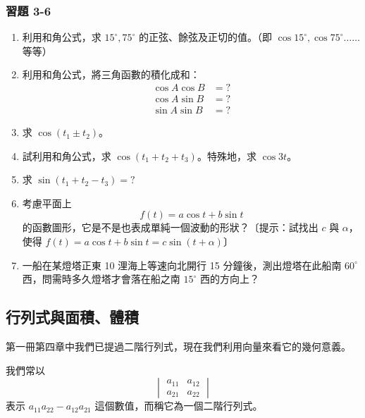 \subsubsection*{習題 3-6}

\begin{enumerate}[label=\arabic*., leftmargin=2em]
  \item 利用和角公式，求 $15^\circ, 75^\circ$ 的正弦、餘弦及正切的值。（即 $\cos 15^\circ, \cos 75^\circ \dots\dots$ 等等）
  \item 利用和角公式，將三角函數的積化成和：
  \begin{align*}
  \cos A\cos B &= ? \\
  \cos A\sin B &= ? \\
  \sin A\sin B &= ?
  \end{align*}
  \item 求 $\cos(t_1 \pm t_2)$。
  \item 試利用和角公式，求 $\cos(t_1 + t_2 + t_3)$。特殊地，求 $\cos 3t$。
  \item 求 $\sin(t_1 + t_2 - t_3) = ?$
  \item 考慮平面上
  \[ f(t) = a\cos t + b\sin t \]
  的函數圖形，它是不是也表成單純一個波動的形狀？〔提示：試找出 $c$ 與 $\alpha$，使得 $f(t) = a\cos t + b\sin t = c\sin(t + \alpha)$〕
  \item[\textbf{*7.}] 一船在某燈塔正東 10 浬海上等速向北開行 15 分鐘後，測出燈塔在此船南 $60^\circ$ 西，問需時多久燈塔才會落在船之南 $15^\circ$ 西的方向上？
\end{enumerate}

\subsection{行列式與面積、體積}
\label{sec:b3-3-7}

第一冊第四章中我們已提過二階行列式，現在我們利用向量來看它的幾何意義。

\begin{definition}
我們常以
\[ \begin{vmatrix} a_{11} & a_{12} \\ a_{21} & a_{22} \end{vmatrix} \]
表示 $a_{11}a_{22} - a_{12}a_{21}$ 這個數值，而稱它為一個二階行列式。
\end{definition}

